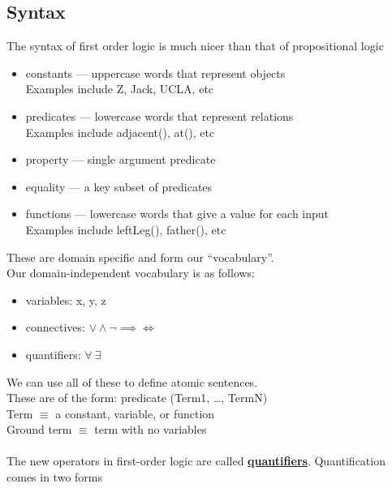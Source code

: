 \documentclass[../../lecture_notes.tex]{subfiles}
\begin{document}
\subsection*{Syntax}
\noindent The syntax of first order logic is much nicer than that of propositional logic
	\begin{itemize} [itemsep=0mm]
		\item constants — uppercase words that represent objects\\
			Examples include Z, Jack, UCLA, etc
		\item predicates — lowercase words that represent relations\\
			Examples include adjacent(),  at(), etc 
		\item property — single argument predicate
	        \item equality —  a key subset of predicates
    		\item functions — lowercase words that give a value for each input\\
		        Examples include leftLeg(), father(), etc
	\end{itemize}
\noindent These are domain specific and form our “vocabulary”.\\
Our domain-independent vocabulary is as follows:
	\begin{itemize} [itemsep=0mm]
		\item variables: x, y, z
		\item connectives: $\lor \land \neg \implies \iff$
		\item quantifiers: $\forall \ \exists$
	\end{itemize}
\noindent We can use all of these to define atomic sentences.\\
These are of the form: predicate (Term1, …, TermN)\\
	\indent Term $\equiv$ a constant, variable, or function\\
	\indent Ground term $\equiv$ term with no variables\\
\\
The new operators in first-order logic are called \textbf{\underline{quantifiers}}.
Quantification comes in two forms
\end{document}
